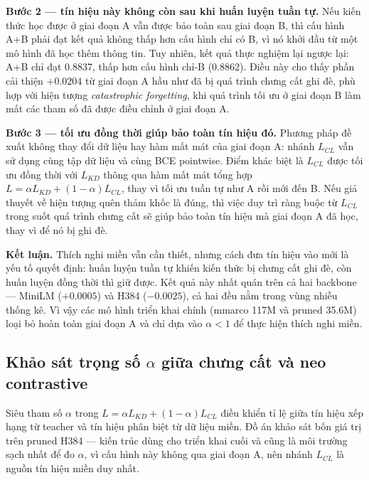 \documentclass[../DoAn.tex]{subfiles}
\begin{document}
\noindent\textbf{Bước 2 --- tín hiệu này không còn sau khi huấn luyện tuần tự.} Nếu kiến thức học được ở giai đoạn A vẫn được bảo toàn sau giai đoạn B, thì cấu hình A+B phải đạt kết quả không thấp hơn cấu hình chỉ có B, vì nó khởi đầu từ một mô hình đã học thêm thông tin. Tuy nhiên, kết quả thực nghiệm lại ngược lại: A+B chỉ đạt 0.8837, thấp hơn cấu hình chỉ-B (0.8862). Điều này cho thấy phần cải thiện $+0.0204$ từ giai đoạn A hầu như đã bị quá trình chưng cất ghi đè, phù hợp với hiện tượng \emph{catastrophic forgetting}, khi quá trình tối ưu ở giai đoạn B làm mất các tham số đã được điều chỉnh ở giai đoạn A.

\noindent\textbf{Bước 3 --- tối ưu đồng thời giúp bảo toàn tín hiệu đó.} Phương pháp đề xuất không thay đổi dữ liệu hay hàm mất mát của giai đoạn A: nhánh $L_{CL}$ vẫn sử dụng cùng tập dữ liệu và cùng BCE pointwise. Điểm khác biệt là $L_{CL}$ được tối ưu đồng thời với $L_{KD}$ thông qua hàm mất mát tổng hợp $L=\alpha L_{KD}+(1-\alpha)L_{CL}$, thay vì tối ưu tuần tự như A rồi mới đến B. Nếu giả thuyết về hiện tượng quên thảm khốc là đúng, thì việc duy trì ràng buộc từ $L_{CL}$ trong suốt quá trình chưng cất sẽ giúp bảo toàn tín hiệu mà giai đoạn A đã học, thay vì để nó bị ghi đè.

\noindent\textbf{Kết luận.} Thích nghi miền vẫn cần thiết, nhưng cách đưa tín hiệu vào mới là yếu tố quyết định: huấn luyện tuần tự khiến kiến thức bị chưng cất ghi đè, còn huấn luyện đồng thời thì giữ được. Kết quả này nhất quán trên cả hai backbone --- MiniLM ($+0.0005$) và H384 ($-0.0025$), cả hai đều nằm trong vùng nhiễu thống kê. Vì vậy các mô hình triển khai chính (mmarco 117M và pruned 35.6M) loại bỏ hoàn toàn giai đoạn A và chỉ dựa vào $\alpha < 1$ để thực hiện thích nghi miền.
\subsection{Khảo sát trọng số \texorpdfstring{$\alpha$}{alpha} giữa chưng cất và neo contrastive}
\label{subsection:alpha-sweep}

Siêu tham số $\alpha$ trong $L = \alpha L_{KD} + (1-\alpha) L_{CL}$ điều khiển tỉ lệ giữa tín hiệu xếp hạng từ teacher và tín hiệu phân biệt từ dữ liệu miền. Đồ án khảo sát bốn giá trị trên pruned H384 --- kiến trúc dùng cho triển khai cuối và cũng là môi trường sạch nhất để đo $\alpha$, vì cấu hình này không qua giai đoạn A, nên nhánh $L_{CL}$ là nguồn tín hiệu miền duy nhất.
\end{document}
